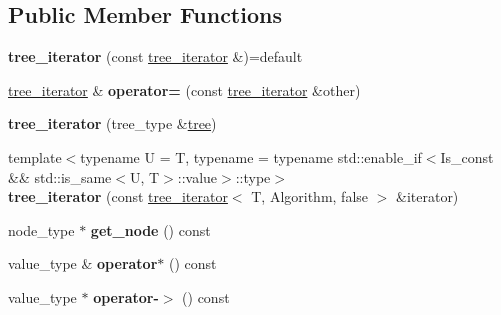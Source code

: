 \subsection*{Public Member Functions}
\begin{DoxyCompactItemize}
\item 
{\bfseries tree\+\_\+iterator} (const \hyperlink{classds_1_1tree__iterator}{tree\+\_\+iterator} \&)=default\hypertarget{classds_1_1tree__iterator_a93e2b750dcbb586e47cf79a969cdcaea}{}\label{classds_1_1tree__iterator_a93e2b750dcbb586e47cf79a969cdcaea}

\item 
\hyperlink{classds_1_1tree__iterator}{tree\+\_\+iterator} \& {\bfseries operator=} (const \hyperlink{classds_1_1tree__iterator}{tree\+\_\+iterator} \&other)\hypertarget{classds_1_1tree__iterator_a58f5bdfb1e0ac4e8c38679eda0bc6e1a}{}\label{classds_1_1tree__iterator_a58f5bdfb1e0ac4e8c38679eda0bc6e1a}

\item 
{\bfseries tree\+\_\+iterator} (tree\+\_\+type \&\hyperlink{classds_1_1tree}{tree})\hypertarget{classds_1_1tree__iterator_abb93363d670daa1ba369f196ee564a3c}{}\label{classds_1_1tree__iterator_abb93363d670daa1ba369f196ee564a3c}

\item 
{\footnotesize template$<$typename U  = T, typename  = typename std\+::enable\+\_\+if$<$\+Is\+\_\+const \&\& std\+::is\+\_\+same$<$\+U, T$>$\+::value$>$\+::type$>$ }\\{\bfseries tree\+\_\+iterator} (const \hyperlink{classds_1_1tree__iterator}{tree\+\_\+iterator}$<$ T, Algorithm, false $>$ \&iterator)\hypertarget{classds_1_1tree__iterator_a2a67a55dfa916b78e873e404f45594b1}{}\label{classds_1_1tree__iterator_a2a67a55dfa916b78e873e404f45594b1}

\item 
node\+\_\+type $\ast$ {\bfseries get\+\_\+node} () const \hypertarget{classds_1_1tree__iterator_a5182a2461a1957c620fdab121f45d0ef}{}\label{classds_1_1tree__iterator_a5182a2461a1957c620fdab121f45d0ef}

\item 
value\+\_\+type \& {\bfseries operator$\ast$} () const \hypertarget{classds_1_1tree__iterator_aadc780b135d43bef920f95b568b5c03f}{}\label{classds_1_1tree__iterator_aadc780b135d43bef920f95b568b5c03f}

\item 
value\+\_\+type $\ast$ {\bfseries operator-\/$>$} () const \hypertarget{classds_1_1tree__iterator_ab159c289807d8e1b3174a684ed09fe8a}{}\label{classds_1_1tree__iterator_ab159c289807d8e1b3174a684ed09fe8a}


\end{DoxyCompactItemize}
